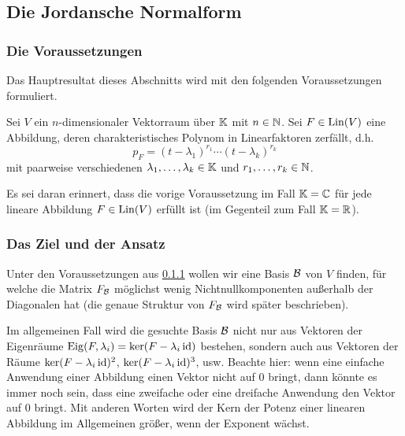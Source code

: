 \clearpage
\subsection{Die Jordansche Normalform}
\label{sec:6_4}

\subsubsection{Die Voraussetzungen}
\label{sec:6_4_1}

Das Hauptresultat dieses Abschnitts wird mit den folgenden Voraussetzungen formuliert.

\begin{tcolorbox}
	Sei $ V $ ein $ n $-dimensionaler Vektorraum über $ \mathbb K $ mit $ n \in \mathbb N $. Sei $ F \in \operatorname{Lin}(V) $ eine Abbildung, deren charakteristisches Polynom in Linearfaktoren zerfällt, d.h.
			\begin{equation*}
				p_F = (t - \lambda_1)^{r_1} \cdots (t - \lambda_k)^{r_k}
			\end{equation*}
			mit paarweise verschiedenen $ \lambda_1, \ldots, \lambda_k \in \mathbb K $ und $ r_1, \ldots, r_k \in \mathbb N $.
\end{tcolorbox}

\noindent Es sei daran erinnert, dass die vorige Voraussetzung im Fall $ \mathbb K = \mathbb C $ für jede lineare Abbildung $ F \in \operatorname{Lin}(V) $ erfüllt ist (im Gegenteil zum Fall $ \mathbb K = \mathbb R $).

\subsubsection{Das Ziel und der Ansatz}

Unter den Voraussetzungen aus \ref{sec:6_4_1} wollen wir eine Basis $ \mathcal{B} $ von $ V $ finden, für welche die Matrix $ F_{\mathcal{B}} $ möglichst wenig Nichtnullkomponenten außerhalb der Diagonalen hat (die genaue Struktur von $ F_{\mathcal{B}} $ wird später beschrieben).

Im allgemeinen Fall wird die gesuchte Basis $ \mathcal{B} $ nicht nur aus Vektoren der Eigenräume $ \operatorname{Eig}(F,\lambda_i) = \ker(F - \lambda_i \operatorname{id}) $ bestehen, sondern auch aus Vektoren der Räume $ \ker(F - \lambda_i \operatorname{id})^2 $, $ \ker(F - \lambda_i \operatorname{id})^3 $, usw. Beachte hier: wenn eine einfache Anwendung einer Abbildung einen Vektor nicht auf $0$ bringt, dann könnte es immer noch sein, dass eine zweifache oder eine dreifache Anwendung den Vektor auf $0$ bringt. Mit anderen Worten wird der Kern der Potenz einer linearen Abbildung im Allgemeinen größer, wenn der Exponent wächst. 

